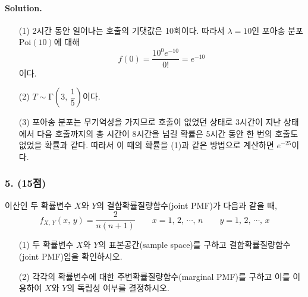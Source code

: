 \paragraph{Solution.} \begin{itemize}
    \item [(1)] {
		2시간 동안 일어나는 호출의 기댓값은 10회이다. 따라서 $\lambda = 10$인 포아송 분포 $\mathrm{Poi}\left(10\right)$에 대해
		\[f\left(0\right) = \frac{10^0 e^{-10}}{0!} = e^{-10}\]
		이다.
	}
    \item [(2)] {
		$T \sim \mathrm{\Gamma}\left(3,\, \dfrac{1}{5}\right)$이다.
	}
	\item [(3)] 포아송 분포는 무기억성을 가지므로 호출이 없었던 상태로 3시간이 지난 상태에서 다음 호출까지의 총 시간이 8시간을 넘길 확률은
	5시간 동안 한 번의 호출도 없었을 확률과 같다. 따라서 이 때의 확률을 (1)과 같은 방법으로 계산하면 $e^{-25}$이다.
\end{itemize}

\subsubsection{5. (15점)} 이산인 두 확률변수 $X$와 $Y$의 결합확률질량함수(joint PMF)가 다음과 같을 때, 
\[f_{X,\,Y}\left(x,\,y\right) = \frac{2}{n\left(n + 1\right)} \qquad x=1,\,2,\,\cdots,\,n \qquad y=1,\,2,\,\cdots,\,x \]
\begin{itemize}
    \item [(1)] 두 확률변수 $X$와 $Y$의 표본공간(sample space)를 구하고 결합확률질량함수(joint PMF)임을 확인하시오.
    \item [(2)] 각각의 확률변수에 대한 주변확률질량함수(marginal PMF)를 구하고 이를 이용하여 $X$와 $Y$의 독립성 여부를 결정하시오.
\end{itemize}

